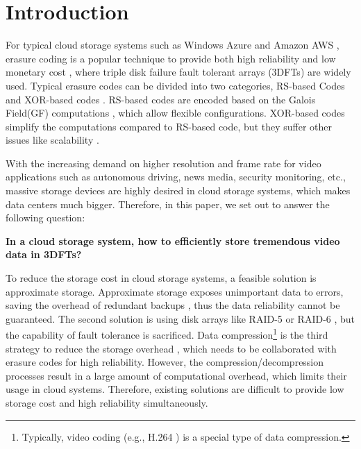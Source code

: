 \documentclass[sigconf]{acmart}
\begin{document}

\maketitle


\section{Introduction}
For typical cloud storage systems such as Windows Azure \cite{calder2011windows} and Amazon AWS \cite{bermudez2013exploring}, erasure coding is a popular technique to provide both high reliability and low monetary cost \cite{EVENODD, RDP, BlaumRoth, XCode, CRS, TripleStar, TPtech, RSL}, where triple disk failure fault tolerant arrays (3DFTs) are widely used. Typical erasure codes can be divided into two categories, RS-based Codes \cite{RS} \cite{LRC} and XOR-based codes \cite{EVENODD, hcode, STAR, TIP}. RS-based codes are encoded based on the Galois Field(GF) computations \cite{RS}, which allow flexible configurations. XOR-based codes simplify the computations compared to RS-based code, but they suffer other issues like scalability \cite{wu2012sdm, jiang2016bdr}.

With the increasing demand on higher resolution and frame rate for video applications such as autonomous driving, news media, security monitoring, etc., massive storage devices are highly desired in cloud storage systems, which makes data centers much bigger.
Therefore, in this paper, we set out to answer the following question:

\textbf{In a cloud storage system, how to efficiently store tremendous video data in 3DFTs?}

To reduce the storage cost in cloud storage systems, a feasible solution is approximate storage. Approximate storage exposes unimportant data to errors, saving the overhead of redundant backups \cite{niklaus2018context, sampson2014approximate} , thus the data reliability cannot be guaranteed.
The second solution is using disk arrays like RAID-5\cite{menon1995performance} or RAID-6 \cite{RAID}, but the capability of fault tolerance is sacrificed.
Data compression\footnote{Typically, video coding (e.g., H.264 \cite{wiegand2003overview}) is a special type of data compression.}
is the third strategy to reduce the storage overhead \cite{ziv1977universal, ziv1978compression, deutsch1996deflate}, which needs to be collaborated with erasure codes for high reliability. However, the compression/decompression processes result in a large amount of computational overhead, which limits their usage in cloud systems. 
Therefore, existing solutions are difficult to provide low storage cost and high reliability simultaneously.
\end{document}
